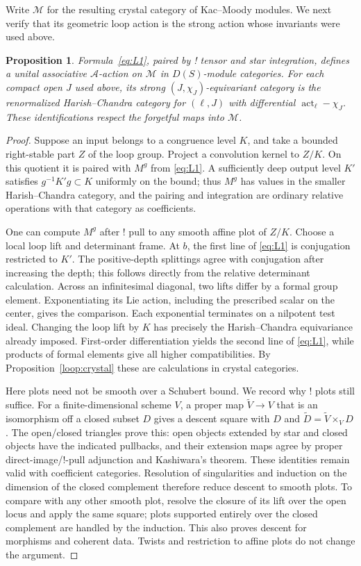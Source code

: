 \documentclass[11pt]{article}
\numberwithin{equation}{section}
\newtheorem{proposition}[theorem]{Proposition}
\theoremstyle{definition}
\theoremstyle{remark}
\begin{document}
Write $\mathcal M$ for the resulting crystal category of Kac--Moody
modules.  We next verify that its geometric loop action is the strong
action whose invariants were used above.

\begin{proposition}\label{loop:strong-action}
Formula~\eqref{eq:L1}, paired by ! tensor and star integration, defines
a unital associative $\mathcal A$-action on $\mathcal M$ in
$D(S)$-module categories.  For each compact open $J$ used above, its
strong $(J,\chi_J)$-equivariant category is the renormalized
Harish--Chandra category for $(\ell,J)$ with differential
$\operatorname{act}_\ell-\chi_J$.  These identifications respect
the forgetful maps into $\mathcal M$.
\end{proposition}

\begin{proof}
Suppose an input belongs to a congruence level $K$, and take a bounded
right-stable part $Z$ of the loop group.  Project a convolution kernel
to $Z/K$.  On this quotient it is paired with $M^g$ from
\eqref{eq:L1}.  A sufficiently deep output level $K'$ satisfies
$g^{-1}K'g\subset K$ uniformly on the bound; thus $M^g$ has values in
the smaller Harish--Chandra category, and the pairing and integration
are ordinary relative operations with that category as coefficients.

One can compute $M^g$ after ! pull to any smooth affine plot of $Z/K$.
Choose a local loop lift and determinant frame.  At $b$, the first
line of \eqref{eq:L1} is conjugation restricted to $K'$.  The
positive-depth splittings agree with conjugation after increasing
the depth; this follows directly from the relative determinant
calculation.  Across an infinitesimal diagonal, two lifts differ by
a formal group element.  Exponentiating its Lie action, including
the prescribed scalar on the center, gives the comparison.  Each
exponential terminates on a nilpotent test ideal.  Changing the loop
lift by $K$ has precisely the Harish--Chandra equivariance already
imposed.  First-order differentiation yields the second line of
\eqref{eq:L1}, while products of formal elements give all higher
compatibilities.  By Proposition~\ref{loop:crystal} these are
calculations in crystal categories.

Here plots need not be smooth over a Schubert bound.  We record why
! plots still suffice.  For a finite-dimensional scheme $V$, a proper
map $\widetilde V\to V$ that is an isomorphism off a closed subset
$D$ gives a descent square with $D$ and
$\widetilde D=\widetilde V\times_VD$.  The open/closed triangles
prove this: open objects extended by star and closed objects have
the indicated pullbacks, and their extension maps agree by proper
direct-image/!-pull adjunction and Kashiwara's theorem.  These
identities remain valid with coefficient categories.  Resolution
of singularities and induction on the dimension of the closed
complement therefore reduce descent to smooth plots.  To compare
with any other smooth plot, resolve the closure of its lift over
the open locus and apply the same square; plots supported entirely
over the closed complement are handled by the induction.  This
also proves descent for morphisms and coherent data.  Twists and
restriction to affine plots do not change the argument.


\end{proof}
\end{document}
